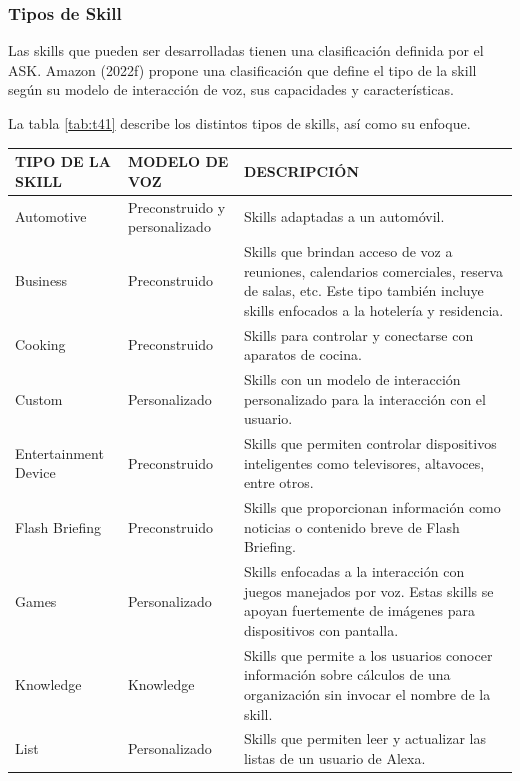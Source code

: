 \subsubsection{Tipos de Skill}
\label{TiposSkillcapIV}

Las skills que pueden ser desarrolladas tienen una clasificación definida por el ASK. Amazon (2022f) propone una clasificación que define el tipo de la skill según su modelo de interacción de voz, sus capacidades y características.

La tabla \ref{tab:t41} describe los distintos tipos de skills, así como su enfoque.

\begin{table}
  \begin{center}
    \begin{tabular}{ | p{4cm} | p{4cm} | p{8cm} | }
      \hline
      TIPO DE LA SKILL & MODELO DE VOZ & DESCRIPCIÓN  \\ \hline
      Automotive & Preconstruido y personalizado & Skills adaptadas a un automóvil. \\ \hline
      Business & Preconstruido & Skills que brindan acceso de voz a reuniones, calendarios comerciales, reserva de salas, etc. Este tipo también incluye skills enfocados a la hotelería y residencia. \\ \hline
      Cooking & Preconstruido & Skills para controlar y conectarse con aparatos de cocina. \\ \hline
      Custom & Personalizado & Skills con un modelo de interacción personalizado para la interacción con el usuario. \\ \hline
      Entertainment Device & Preconstruido & Skills que permiten controlar dispositivos inteligentes como televisores, altavoces, entre otros. \\ \hline
      Flash Briefing & Preconstruido & Skills que proporcionan información como noticias o contenido breve de Flash Briefing. \\ \hline
      Games & Personalizado & Skills enfocadas a la interacción con juegos manejados por voz. Estas skills se apoyan fuertemente de imágenes para dispositivos con pantalla. \\ \hline
      Knowledge & Knowledge & Skills que permite a los usuarios conocer información sobre cálculos de una organización sin invocar el nombre de la skill. \\ \hline
      List & Personalizado & Skills que permiten leer y actualizar las listas de un usuario de Alexa. \\ \hline

\end{tabular}
\end{center}
\end{table}
